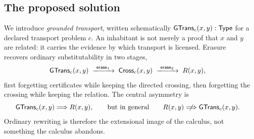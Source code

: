 \subsection{The proposed solution}
We introduce \emph{grounded transport}, written schematically $\mathsf{GTrans}_c(x,y) : \mathsf{Type}$ for a declared transport problem $c$. An inhabitant is not merely a proof that $x$ and $y$ are related: it carries the evidence by which transport is licensed. Erasure recovers ordinary substitutability in two stages,
\[
\mathsf{GTrans}_c(x,y) \;\xrightarrow{\ \mathsf{erase}_1\ }\; \mathsf{Cross}_c(x,y) \;\xrightarrow{\ \mathsf{erase}_2\ }\; R(x,y),
\]
first forgetting certificates while keeping the directed crossing, then forgetting the crossing while keeping the relation. The central asymmetry is
\[
\GTrans_c(x,y) \Longrightarrow R(x,y), \qquad\text{but in general}\qquad R(x,y) \centernot\Longrightarrow \GTrans_c(x,y).
\]
Ordinary rewriting is therefore the extensional image of the calculus, not something the calculus abandons.


